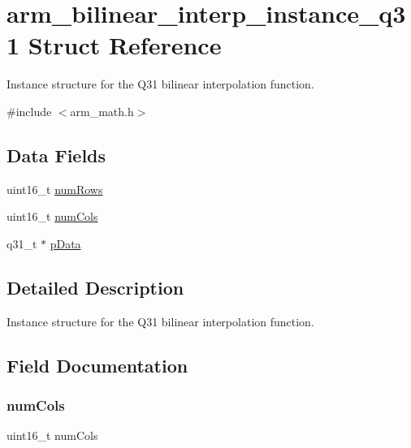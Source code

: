 \hypertarget{structarm__bilinear__interp__instance__q31}{}\section{arm\+\_\+bilinear\+\_\+interp\+\_\+instance\+\_\+q31 Struct Reference}
\label{structarm__bilinear__interp__instance__q31}


Instance structure for the Q31 bilinear interpolation function.  




{\ttfamily \#include $<$arm\+\_\+math.\+h$>$}

\subsection*{Data Fields}
\begin{DoxyCompactItemize}
\item 
uint16\+\_\+t \mbox{\hyperlink{structarm__bilinear__interp__instance__q31_a1bcf80ccdc2acc29198f1592ae300390}{num\+Rows}}
\item 
uint16\+\_\+t \mbox{\hyperlink{structarm__bilinear__interp__instance__q31_a4bb5ec0d13eb4c9cf887aa8366a44117}{num\+Cols}}
\item 
q31\+\_\+t $\ast$ \mbox{\hyperlink{structarm__bilinear__interp__instance__q31_ad296f76577326ff280726323536eed6d}{p\+Data}}
\end{DoxyCompactItemize}


\subsection{Detailed Description}
Instance structure for the Q31 bilinear interpolation function. 

\subsection{Field Documentation}
\mbox{\label{structarm__bilinear__interp__instance__q31_a4bb5ec0d13eb4c9cf887aa8366a44117}} 
\subsubsection{\texorpdfstring{num\+Cols}{numCols}}
{\footnotesize\ttfamily uint16\+\_\+t num\+Cols}

